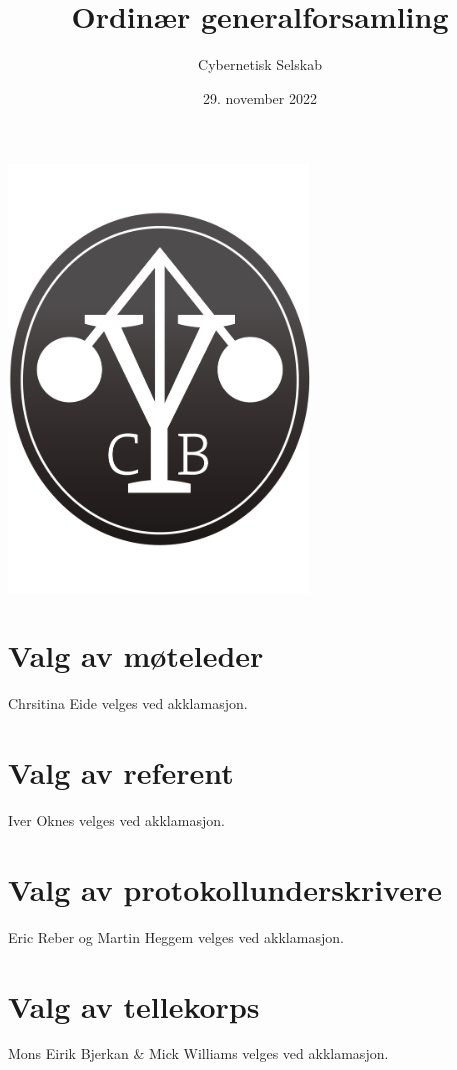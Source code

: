 \documentclass[10pt,norsk,a4paper,usenames,dvipsnames]{article}
\title{\huge Ordinær generalforsamling}
\author{\LARGE Cybernetisk Selskab}
\date{29. november 2022}
\begin{document}
\maketitle



\begin{center}


\includegraphics[width=0.6\textwidth,height=0.6\textheight,keepaspectratio=true]{cyblogoa3.pdf}

\end{center}


\newpage


\tableofcontents

\section{Valg av møteleder}
Chrsitina Eide velges ved akklamasjon.

\section{Valg av referent}
Iver Oknes velges ved akklamasjon.


\section{Valg av protokollunderskrivere}
Eric Reber og Martin Heggem velges ved akklamasjon.


\section{Valg av tellekorps}
Mons Eirik Bjerkan \& Mick Williams velges ved akklamasjon.
\end{document}
